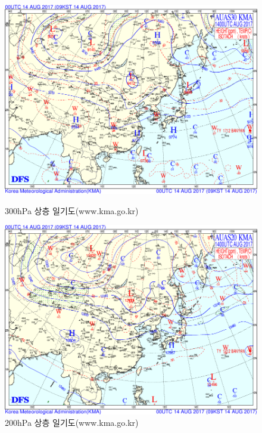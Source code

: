 \begin{figure}[p]\centering
	\begin{minipage}{0.97\textwidth}
	\includegraphics[width=0.97\linewidth]{22Weather_forecasting/images/up30_2017081400}
		\caption{300hPa 상층 일기도(www.kma.go.kr)}
		\label{fig:draw-weathermapsurf30}
	\end{minipage}
	\begin{minipage}{0.97\textwidth}
	\includegraphics[width=0.97\linewidth]{22Weather_forecasting/images/up20_2017081400}
		\caption{200hPa 상층 일기도(www.kma.go.kr)}
		\label{fig:draw-weathermapsurf20}
	\end{minipage}
\end{figure}

